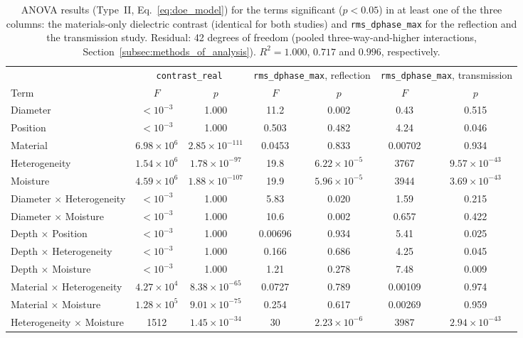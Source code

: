 \begin{table}[t]
\centering
\caption{ANOVA results (Type~II, Eq.~\ref{eq:doe_model}) for the terms significant ($p<0.05$) in at least one of the three columns: the materials-only dielectric contrast (identical for both studies) and \texttt{rms\_dphase\_max} for the reflection and the transmission study. Residual: 42 degrees of freedom (pooled three-way-and-higher interactions, Section~\ref{subsec:methods_of_analysis}). $R^2=1.000$, $0.717$ and $0.996$, respectively.}
\label{tab:anova_headline}
\begin{tabular}{lcccccc}
\hline
 & \multicolumn{2}{c}{\texttt{contrast\_real}} & \multicolumn{2}{c}{\texttt{rms\_dphase\_max}, reflection} & \multicolumn{2}{c}{\texttt{rms\_dphase\_max}, transmission} \\
\cline{2-3}\cline{4-5}\cline{6-7}
Term & $F$ & $p$ & $F$ & $p$ & $F$ & $p$ \\
\hline
Diameter & $<10^{-3}$ & 1.000 & 11.2 & 0.002 & 0.43 & 0.515 \\
Position & $<10^{-3}$ & 1.000 & 0.503 & 0.482 & 4.24 & 0.046 \\
Material & $6.98\times10^{6}$ & $2.85\times10^{-111}$ & 0.0453 & 0.833 & 0.00702 & 0.934 \\
Heterogeneity & $1.54\times10^{6}$ & $1.78\times10^{-97}$ & 19.8 & $6.22\times10^{-5}$ & 3767 & $9.57\times10^{-43}$ \\
Moisture & $4.59\times10^{6}$ & $1.88\times10^{-107}$ & 19.9 & $5.96\times10^{-5}$ & 3944 & $3.69\times10^{-43}$ \\
Diameter $\times$ Heterogeneity & $<10^{-3}$ & 1.000 & 5.83 & 0.020 & 1.59 & 0.215 \\
Diameter $\times$ Moisture & $<10^{-3}$ & 1.000 & 10.6 & 0.002 & 0.657 & 0.422 \\
Depth $\times$ Position & $<10^{-3}$ & 1.000 & 0.00696 & 0.934 & 5.41 & 0.025 \\
Depth $\times$ Heterogeneity & $<10^{-3}$ & 1.000 & 0.166 & 0.686 & 4.25 & 0.045 \\
Depth $\times$ Moisture & $<10^{-3}$ & 1.000 & 1.21 & 0.278 & 7.48 & 0.009 \\
Material $\times$ Heterogeneity & $4.27\times10^{4}$ & $8.38\times10^{-65}$ & 0.0727 & 0.789 & 0.00109 & 0.974 \\
Material $\times$ Moisture & $1.28\times10^{5}$ & $9.01\times10^{-75}$ & 0.254 & 0.617 & 0.00269 & 0.959 \\
Heterogeneity $\times$ Moisture & 1512 & $1.45\times10^{-34}$ & 30 & $2.23\times10^{-6}$ & 3987 & $2.94\times10^{-43}$ \\
\hline
\end{tabular}
\end{table}
